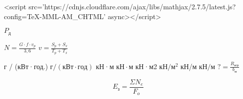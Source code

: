 <script src='https://cdnjs.cloudflare.com/ajax/libs/mathjax/2.7.5/latest.js?config=TeX-MML-AM_CHTML' async></script>



\(P_д\)

\displaystyle \(N=\frac{G \cdot f \cdot v_p}{3,6}\)
\(\displaystyle v=\frac{S_p+S_x}{T_p+T_x}\)


г / (кВт·год.) \( г / (кВт \cdot год) \)
кН·м           \( кН \cdot м \)
кН·м2          \(кН/м^2\)
кН/м           \(кН/м\)
\( \displaystyle ?=\frac{R_{агр}}{b_м} \) 

$$
E_{з}=\frac{\Sigma N_e}{F_o}
$$